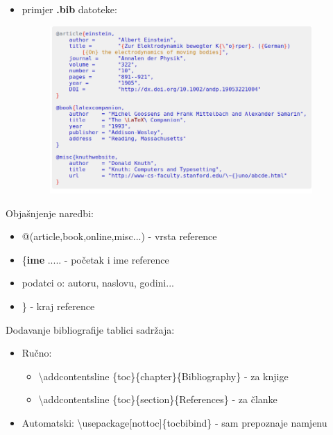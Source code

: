 \documentclass{beamer}
\begin{document}
\begin{frame}
\begin{itemize}
    \item primjer \textbf{.bib} datoteke:
    \begin{figure}
    \includegraphics[width=10cm]{bibtexZaseban2.png}
    \end{figure}
\end{itemize}    
\end{frame}

\begin{frame}
Objašnjenje naredbi:
\begin{itemize}
    \item @(article,book,online,misc...) - vrsta reference \\
    \item \{\textbf{ime} ..... - početak i ime reference \\
    \item podatci o: autoru, naslovu, godini... \\
    \item \} - kraj reference
\end{itemize}
Dodavanje bibliografije tablici sadržaja:
\begin{itemize}
    \item Ručno: \\
    \begin{itemize}
        \item \textbackslash addcontentsline \{toc\}\{chapter\}\{Bibliography\} - za knjige \\
        \item \textbackslash addcontentsline \{toc\}\{section\}\{References\} - za članke \\
    \end{itemize}
    \item Automatski: \textbackslash usepackage[nottoc]\{tocbibind\} - sam prepoznaje namjenu\\
\end{itemize}
\end{frame}
\end{document}

